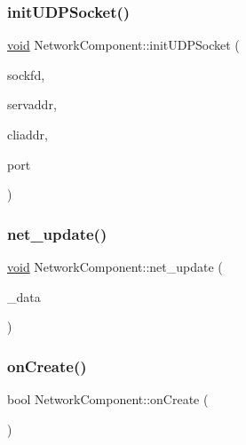\mbox{\label{classNetworkComponent_ac9b1363974a7c04d37c662c152a956d5}} 
\subsubsection{\texorpdfstring{init\+U\+D\+P\+Socket()}{initUDPSocket()}}
{\footnotesize\ttfamily \hyperlink{imgui__impl__opengl3__loader_8h_ac668e7cffd9e2e9cfee428b9b2f34fa7}{void} Network\+Component\+::init\+U\+D\+P\+Socket (\begin{DoxyParamCaption}\item[{int \&}]{sockfd,  }\item[{struct sockaddr\+\_\+in \&}]{servaddr,  }\item[{struct sockaddr\+\_\+in \&}]{cliaddr,  }\item[{\hyperlink{stdint_8h_a273cf69d639a59973b6019625df33e30}{uint16\+\_\+t}}]{port }\end{DoxyParamCaption})}

\mbox{\label{classNetworkComponent_ad4521efc1612c9c8731c775060c78687}} 
\subsubsection{\texorpdfstring{net\+\_\+update()}{net\_update()}}
{\footnotesize\ttfamily \hyperlink{imgui__impl__opengl3__loader_8h_ac668e7cffd9e2e9cfee428b9b2f34fa7}{void} Network\+Component\+::net\+\_\+update (\begin{DoxyParamCaption}\item[{\hyperlink{structGameData}{Game\+Data} $\ast$}]{\+\_\+data }\end{DoxyParamCaption})}

\mbox{\label{classNetworkComponent_afe34eefd95bb82a8496c856a19e0f153}} 
\subsubsection{\texorpdfstring{on\+Create()}{onCreate()}}
{\footnotesize\ttfamily bool Network\+Component\+::on\+Create (\begin{DoxyParamCaption}{ }\end{DoxyParamCaption})\hspace{0.3cm}{\ttfamily [virtual]}}



